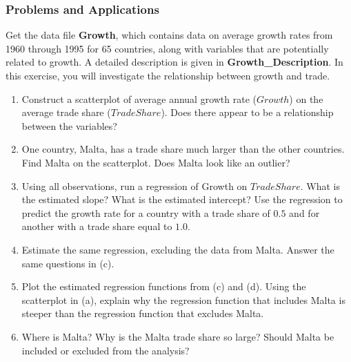

\begin{frame}
\frametitle{Problems and Applications}
Get the data file \textbf{Growth}, which contains data on average growth rates from 1960 through 1995 for 65 countries, along with variables that are potentially related to growth. A detailed description is given in \textbf{Growth\_Description}. In this exercise, you will investigate the relationship between growth and trade.
\begin{enumerate}
\item Construct a scatterplot of average annual growth rate ($Growth$) on the average trade share ($TradeShare$). Does there appear to be a relationship between the variables?
\item One country, Malta, has a trade share much larger than the other countries. Find Malta on the scatterplot. Does Malta look like an outlier?
\item Using all observations, run a regression of Growth on $TradeShare$. What is the estimated slope? What is the estimated intercept? Use the regression to predict the growth rate for a country with a trade share of $0.5$ and for another with a trade share equal to $1.0$.
\item Estimate the same regression, excluding the data from Malta. Answer the same questions in (c).
\item Plot the estimated regression functions from (c) and (d). Using the scatterplot in (a), explain why the regression function that includes Malta is steeper than the regression function that excludes Malta.
\item Where is Malta? Why is the Malta trade share so large? Should Malta be included or excluded from the analysis?
\end{enumerate}
\end{frame}

